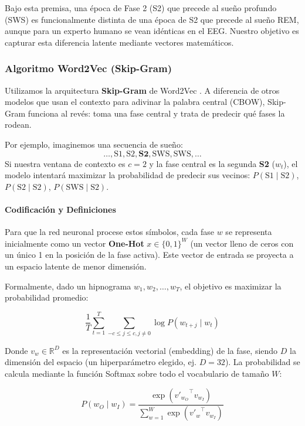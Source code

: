 Bajo esta premisa, una época de Fase 2 (S2) que precede al sueño profundo (SWS) es funcionalmente distinta de una época de S2 que precede al sueño REM, aunque para un experto humano se vean idénticas en el EEG. Nuestro objetivo es capturar esta diferencia latente mediante vectores matemáticos.

\subsubsection{Algoritmo Word2Vec (Skip-Gram)}

Utilizamos la arquitectura \textbf{Skip-Gram} de Word2Vec \cite{mikolov2013efficient, mikolov2013distributed}. A diferencia de otros modelos que usan el contexto para adivinar la palabra central (CBOW), Skip-Gram funciona al revés: toma una fase central y trata de predecir qué fases la rodean.

Por ejemplo, imaginemos una secuencia de sueño:
\[ \dots, \text{S1}, \text{S2}, \mathbf{S2}, \text{SWS}, \text{SWS}, \dots \]
Si nuestra ventana de contexto es $c=2$ y la fase central es la segunda \textbf{S2} ($w_t$), el modelo intentará maximizar la probabilidad de predecir sus vecinos: $P(\text{S1} \mid \text{S2})$, $P(\text{S2} \mid \text{S2})$, $P(\text{SWS} \mid \text{S2})$.

\paragraph*{Codificación y Definiciones}
Para que la red neuronal procese estos símbolos, cada fase $w$ se representa inicialmente como un vector \textbf{One-Hot} $x \in \{0,1\}^W$ (un vector lleno de ceros con un único 1 en la posición de la fase activa). Este vector de entrada se proyecta a un espacio latente de menor dimensión.

Formalmente, dado un hipnograma $w_1, w_2, \dots, w_T$, el objetivo es maximizar la probabilidad promedio:

\begin{equation}
    \frac{1}{T} \sum_{t=1}^{T} \sum_{-c \le j \le c, j \ne 0} \log P(w_{t+j} \mid w_t)
\end{equation}

Donde $v_w \in \mathbb{R}^D$ es la representación vectorial (embedding) de la fase, siendo $D$ la dimensión del espacio (un hiperparámetro elegido, ej. $D=32$). La probabilidad se calcula mediante la función Softmax sobre todo el vocabulario de tamaño $W$:

\begin{equation}
    P(w_O \mid w_I) = \frac{\exp({v'_{w_O}}^\top v_{w_I})}{\sum_{w=1}^{W} \exp({v'_w}^\top v_{w_I})}
\end{equation}

